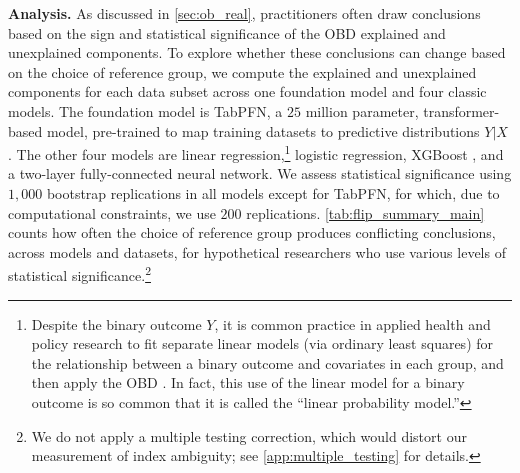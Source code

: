 
\textbf{Analysis.}
As discussed in \cref{sec:ob_real}, practitioners often draw conclusions based on the sign and statistical significance of the OBD explained and unexplained components.
To explore whether these conclusions can change based on the choice of reference group, we compute the explained and unexplained components for each data subset across one foundation model %
 and four classic models. The foundation model is TabPFN, a $25$ million parameter, transformer-based model, pre-trained to map training datasets to predictive distributions $Y|X$ \citep{hollmann2023tabpfn}. The other four models are linear regression,\footnote{Despite the binary outcome $Y$, it is common practice in applied health and policy research to fit separate linear models (via ordinary least squares) for the relationship between a binary outcome and covariates in each group, and then apply the OBD \citep{jann2008, edokaChangesCatastrophicHealth2017, sujin_LPM_OB, mweembaGapSelfRatedHealth2023}. In fact, this use of the linear model for a binary outcome is so common that it is called the ``linear probability model.''} logistic regression, XGBoost \citep{chen2016xgboost}, and a two-layer fully-connected neural network.
We assess statistical significance using $1{,}000$ bootstrap replications in all models except for TabPFN, for which, due to computational constraints, we use $200$ replications.
\cref{tab:flip_summary_main} counts how often the choice of reference group produces conflicting conclusions, across models and datasets, for hypothetical researchers who use various levels of statistical significance.\footnote{We do not apply a multiple testing correction, which would distort our measurement of index ambiguity; see \cref{app:multiple_testing} for details.}

